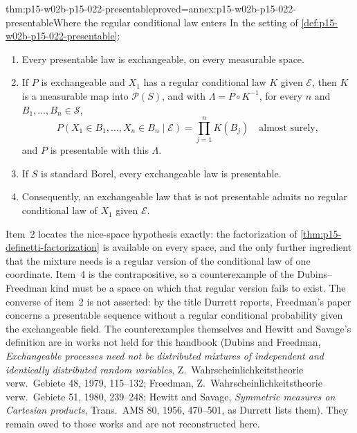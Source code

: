 \begin{hbtheorem}{thm:p15-w02b-p15-022-presentable}{proved=annex:p15-w02b-p15-022-presentable}{Where the regular conditional law enters}
In the setting of \cref{def:p15-w02b-p15-022-presentable}:
\begin{enumerate}
\item Every presentable law is exchangeable, on every measurable space.
\item If \(P\) is exchangeable and \(X_1\) has a regular conditional law
      \(K\) given \(\mathcal E\), then \(K\) is a measurable map into
      \(\mathscr P(S)\), and with \(\Lambda=P\circ K^{-1}\), for every
      \(n\) and \(B_1,\ldots,B_n\in\mathcal S\),
      \[
       P(X_1\in B_1,\ldots,X_n\in B_n\mid\mathcal E)
                    =\prod_{j=1}^nK(B_j)\quad\text{almost surely},
      \]
      and \(P\) is presentable with this \(\Lambda\).
\item If \(S\) is standard Borel, every exchangeable law is presentable.
\item Consequently, an exchangeable law that is not presentable admits no
      regular conditional law of \(X_1\) given \(\mathcal E\).
\end{enumerate}
\end{hbtheorem}

Item~2 locates the nice-space hypothesis exactly: the factorization of
\cref{thm:p15-definetti-factorization} is available on every space, and
the only further ingredient that the mixture needs is a regular version of
the conditional law of one coordinate. Item~4 is the contrapositive, so a
counterexample of the Dubins--Freedman kind must be a space on which that
regular version fails to exist. The converse of item~2 is not asserted:
by the title Durrett reports, Freedman's paper concerns a presentable
sequence without a regular conditional probability given the exchangeable
field. The counterexamples themselves and Hewitt and Savage's definition
are in works not held for this handbook
(Dubins and Freedman, \emph{Exchangeable processes need not be distributed
mixtures of independent and identically distributed random variables},
Z.\ Wahrscheinlichkeitstheorie verw.\ Gebiete 48, 1979, 115--132;
Freedman, Z.\ Wahrscheinlichkeitstheorie verw.\ Gebiete 51, 1980,
239--248; Hewitt and Savage, \emph{Symmetric measures on Cartesian
products}, Trans.\ AMS 80, 1956, 470--501, as Durrett lists them). They
remain owed to those works and are not reconstructed here.


